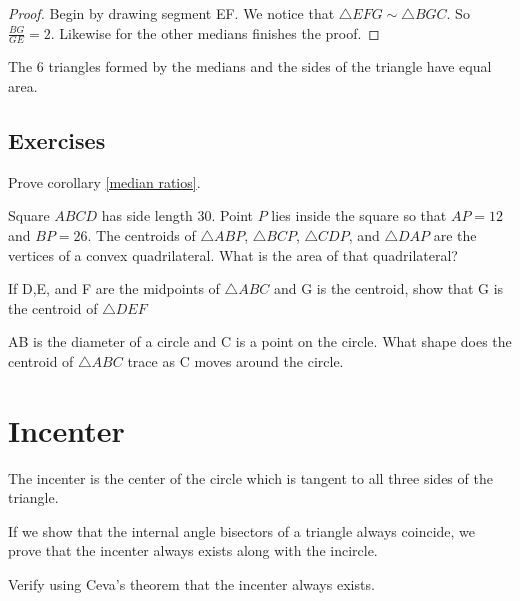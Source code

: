 \documentclass[11pt]{scrartcl}
\theoremstyle{plain}
\begin{document}
    \begin{proof}
        Begin by drawing segment EF. We notice that $\triangle EFG \sim \triangle BGC$.
        So $\frac{BG}{GE} =2$. Likewise for the other medians finishes the proof.
    \end{proof}
    
        \begin{corollary}
        \label{median ratios}
            The 6 triangles formed by the medians and the sides of the triangle have equal area.
        \end{corollary}
    
    \subsection{Exercises}
    \begin{exercise}
        Prove corollary \ref{median ratios}.
    \end{exercise}
    \begin{exercise}[2018 AMC]
        Square $ABCD$ has side length $30$. Point $P$ lies inside the square so that $AP = 12$ and $BP = 26$. The centroids of $\triangle{ABP}$, $\triangle{BCP}$, $\triangle{CDP}$, and $\triangle{DAP}$ are the vertices of a convex quadrilateral. What is the area of that quadrilateral?
    \end{exercise}
    \begin{exercise} If D,E, and F are the midpoints of $\triangle ABC$ and G is the centroid, show that G is the centroid of $\triangle DEF$
    \end{exercise}
    \begin{exercise} AB is the diameter of a circle and C is a point on the circle. What shape does the centroid of $\triangle ABC$ trace as C moves around the circle.
    \end{exercise}

\section{Incenter}
\begin{definition}
    The incenter is the center of the circle which is tangent to all three sides of the triangle.
\end{definition}
If we show that the internal angle bisectors of a triangle always coincide, we prove that the incenter always exists along with the incircle.

\begin{exercise}
    Verify using Ceva's theorem that the incenter always exists.
\end{exercise}
\end{document}

